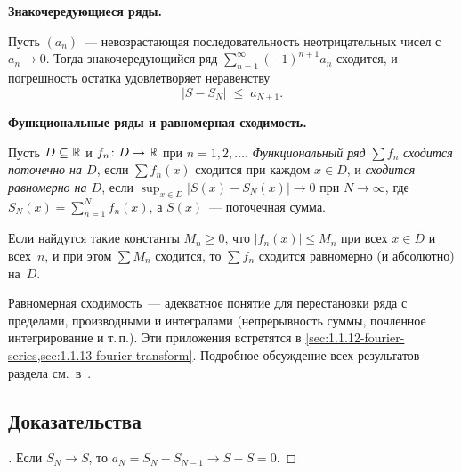 \noindent\textbf{Знакочередующиеся ряды.}

\begin{theorem}
\label{thm:leibniz}
Пусть $(a_n)$~--- невозрастающая последовательность неотрицательных
чисел с $a_n \to 0$. Тогда знакочередующийся ряд
$\sum_{n=1}^{\infty} (-1)^{n+1} a_n$ сходится, и погрешность остатка
удовлетворяет неравенству
\[
  |S - S_N| \;\le\; a_{N+1}.
\]
\end{theorem}

\medskip

\noindent\textbf{Функциональные ряды и равномерная сходимость.}

\begin{definition}
\label{def:functional-series}
Пусть $D \subseteq \mathbb{R}$ и $f_n \colon D \to \mathbb{R}$ при $n = 1, 2, \dots$.
\emph{Функциональный ряд} $\sum f_n$ \emph{сходится поточечно на $D$},
если $\sum f_n(x)$ сходится при каждом $x \in D$, и \emph{сходится
равномерно на $D$}, если
$\sup_{x \in D} \bigl|S(x) - S_N(x)\bigr| \to 0$ при $N \to \infty$,
где $S_N(x) = \sum_{n=1}^{N} f_n(x)$, а $S(x)$~--- поточечная сумма.
\end{definition}

\begin{theorem}
\label{thm:weierstrass-m}
Если найдутся такие константы $M_n \ge 0$, что $|f_n(x)| \le M_n$ при
всех $x \in D$ и всех~$n$, и при этом $\sum M_n$ сходится, то
$\sum f_n$ сходится равномерно (и абсолютно) на~$D$.
\end{theorem}

\begin{remark}
Равномерная сходимость~--- адекватное понятие для перестановки ряда с
пределами, производными и интегралами (непрерывность суммы, почленное
интегрирование и т.\,п.). Эти приложения встретятся в
\cref{sec:1.1.12-fourier-series,sec:1.1.13-fourier-transform}.
Подробное обсуждение всех результатов раздела см.\ в~\cite{Zorich1981}.
\end{remark}

\subsection*{Доказательства}

\begin{proof}[]
Если $S_N \to S$, то $a_N = S_N - S_{N-1} \to S - S = 0$.
\end{proof}


